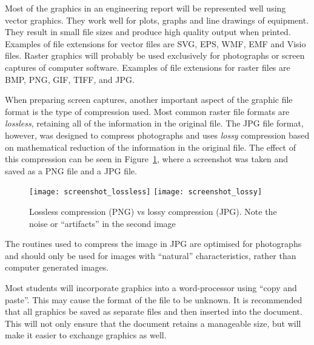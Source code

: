 \documentclass[a4paper,12pt]{article}
\begin{document}
Most of the graphics in an engineering report will be represented well
using vector graphics.  They work well for plots, graphs and line
drawings of equipment.  They result in small file sizes and produce
high quality output when printed.  Examples of file extensions for
vector files are SVG, EPS, WMF, EMF and Visio files.  Raster graphics will
probably be used exclusively for photographs or screen captures of
computer software.  Examples of file extensions for raster files are
BMP, PNG, GIF, TIFF, and JPG.

When preparing screen captures, another important aspect of the
graphic file format is the type of compression used.  Most common
raster file formats are \emph{lossless}, retaining all of the
information in the original file.  The JPG file format, however, was
designed to compress photographs and uses \emph{lossy} compression
based on mathematical reduction of the information in the original
file.  The effect of this compression can be seen in
Figure~\ref{fig:jpgexample}, where a screenshot was taken and saved as
a PNG file and a JPG file.

\begin{figure}[htbp]
  \centering
  \texttt{[image: screenshot\_lossless]}
  \texttt{[image: screenshot\_lossy]}
  \caption{Lossless compression (PNG) vs lossy compression (JPG).
    Note the noise or ``artifacts'' in the second image}
  \label{fig:jpgexample}
\end{figure}

The routines used to compress the image in JPG are optimised for
photographs and should only be used for images with ``natural''
characteristics, rather than computer generated images.

Most students will incorporate graphics into a word-processor using
``copy and paste''.  This may cause the format of the file to be
unknown.  It is recommended that all graphics be saved as separate
files and then inserted into the document.  This will not only ensure
that the document retains a manageable size, but will make it easier
to exchange graphics as well.
\end{document}
